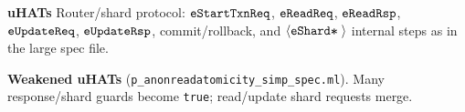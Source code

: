 \textbf{uHATs}
Router/shard protocol: \(\boldsymbol{{\tt eStartTxnReq}}\), \(\boldsymbol{{\tt eReadReq}}\), \(\boldsymbol{{\tt eReadRsp}}\), \(\boldsymbol{{\tt eUpdateReq}}\), \(\boldsymbol{{\tt eUpdateRsp}}\), commit/rollback, and \({\langle} {\boldsymbol{{\tt eShard*}}\;{}} {\rangle}\) internal steps as in the large spec file.

\textbf{Weakened uHATs} (\texttt{p\_anonreadatomicity\_simp\_spec.ml}).
Many response/shard guards become \texttt{true}; read/update shard requests merge.
